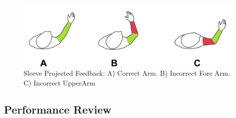 



\begin{figure}[!b]
    \begin{center}
        \includegraphics[width=\columnwidth]{imgs/armvisualfeedback.png}
    \end{center}
    \caption{Sleeve Projected Feedback: A) Correct Arm. B) Incorrect Fore Arm. C) Incorrect UpperArm}
    \label{fig:vision}
\end{figure}

\subsection{Performance Review}